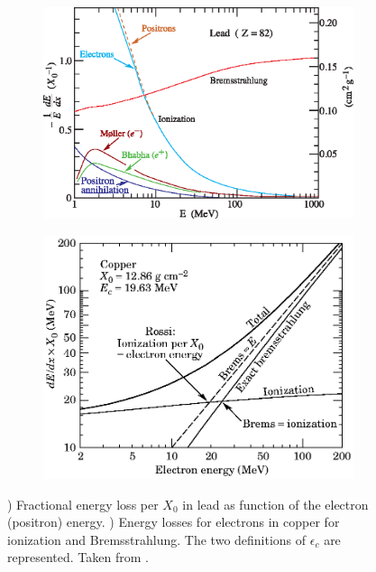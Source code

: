 \begin{figure}[htbp!]
  \centering
  \begin{subfigure}[t]{0.49\textwidth}
    \includegraphics[width=1.\linewidth]{chap2/fig/elossfrac_06.eps}
    \caption{} \label{fig:ElossEM}
  \end{subfigure}
  \hfill
  \begin{subfigure}[t]{0.49\textwidth}
    \includegraphics[width=1.\linewidth]{chap2/fig/encrit_cu.eps}
    \caption{} \label{fig:Ec}
  \end{subfigure}
  \caption{) Fractional energy loss per $X_0$ in lead as function of the electron (positron) energy. ) Energy losses for electrons in copper for ionization and Bremsstrahlung. The two definitions of $\epsilon_{c}$ are represented. Taken from \cite{Patrignani:2016xqp}.}
\end{figure}

